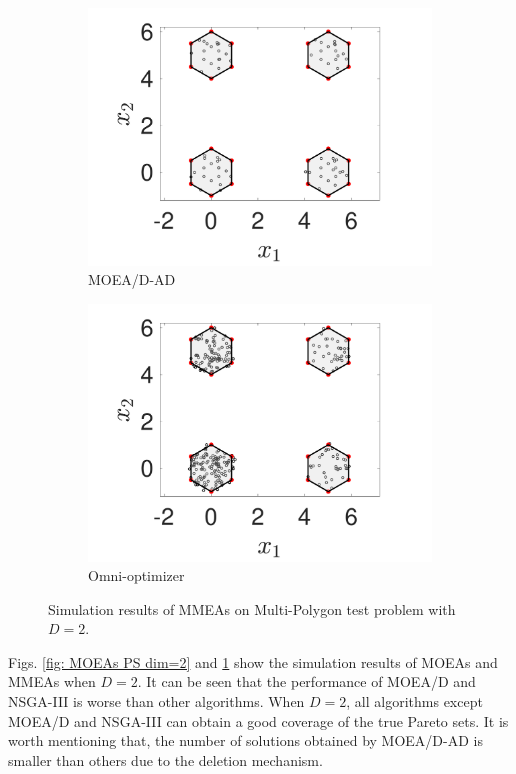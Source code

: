 \documentclass[conference]{IEEEtran}
\begin{document}
\begin{figure}[htbp]
    \begin{subfigure}[b]{.24\textwidth}
    \includegraphics[width=\linewidth]{Section5/dim2/PS/MOEADAD}
    \caption{MOEA/D-AD}
    \end{subfigure}
    \begin{subfigure}[b]{.24\textwidth}
    \includegraphics[width=\linewidth]{Section5/dim2/PS/OmniOptimizer}
    \caption{Omni-optimizer}
    \end{subfigure}
    \caption{Simulation results of MMEAs on Multi-Polygon test problem with $D=2$.}
    \label{fig: MMEAs PS dim=2}
\end{figure}

Figs. \ref{fig: MOEAs PS dim=2} and \ref{fig: MMEAs PS dim=2} show the simulation results of MOEAs and MMEAs when $D=2$. It can be seen that the performance of MOEA/D and NSGA-III is worse than other algorithms. When $D=2$, all algorithms except MOEA/D and NSGA-III can obtain a good coverage of the true Pareto sets. It is worth mentioning that, the number of solutions obtained by MOEA/D-AD is smaller than others due to the deletion mechanism.
\end{document}
